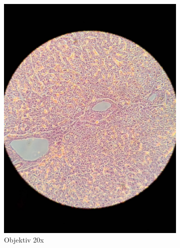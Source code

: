 \begin{figure}[h!]
\begin{subfigure}[b]{0.3\textwidth}
		\includegraphics[width=1\textwidth]{../images/04_human_liver.jpg}
		\caption{Objektiv 20x}
	\end{subfigure}
	\begin{subfigure}[b]{0.3\textwidth}

\end{subfigure}
\end{figure}
